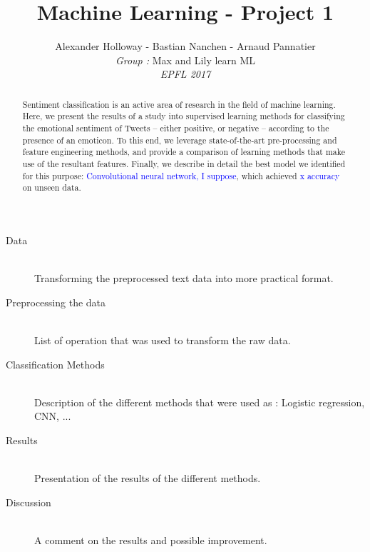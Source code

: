 \documentclass[10pt,conference,compsocconf]{IEEEtran}
\begin{document}
\title{Machine Learning - Project 1}
\author{
 Alexander Holloway - Bastian Nanchen - Arnaud Pannatier 
  \\
  \textit{Group : }Max and Lily learn ML \\
  \textit{EPFL 2017}
}
\maketitle

\begin{abstract}
Sentiment classification is an active area of research in the field of machine learning. Here, we present the results of a study into supervised learning methods for classifying the emotional sentiment of Tweets -- either positive, or negative -- according to the presence of an emoticon. To this end, we leverage state-of-the-art pre-processing and feature engineering methods, and provide a comparison of learning methods that make use of the resultant features. Finally, we describe in detail the best model we identified for this purpose: \textcolor{blue}{Convolutional neural network, I suppose}, which achieved \textcolor{blue}{x accuracy} on unseen data.
\end{abstract}

\begin{description}
\item[Data] \ \\
Transforming the preprocessed text data into more practical format. 
\item[Preprocessing the data] \ \\
List of operation that was used to transform the raw data.
\item[Classification Methods] \ \\
Description of the different methods that were used as : Logistic regression, CNN, ...
\item[Results] \ \\
Presentation of the results of the different methods.
\item[Discussion] \ \\
 A comment on the results and possible improvement.  
\end{description}









\end{document}
